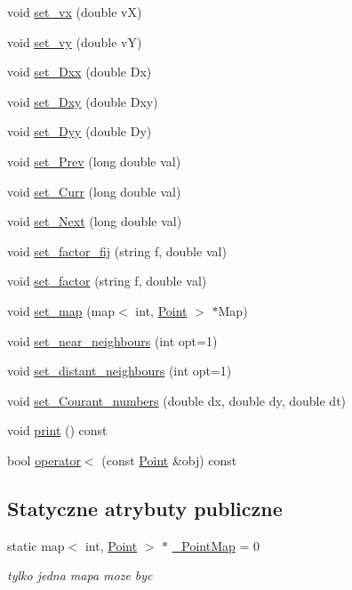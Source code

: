 \begin{DoxyCompactItemize}
\item 
void \hyperlink{class_point_ab68cfb3cd44fe4624dd89ec5b9275350}{set\+\_\+vx} (double v\+X)
\item 
void \hyperlink{class_point_aae045afff208fbd09dc3e466a0768781}{set\+\_\+vy} (double v\+Y)
\item 
void \hyperlink{class_point_a9c89304540fc3a2f9b7a6720f5bad95b}{set\+\_\+\+Dxx} (double Dx)
\item 
void \hyperlink{class_point_a0bf3e2831a50b62754eefb0cab6c3bbd}{set\+\_\+\+Dxy} (double Dxy)
\item 
void \hyperlink{class_point_adc5e03973821b3dee14d6b1c0a8e43ea}{set\+\_\+\+Dyy} (double Dy)
\item 
void \hyperlink{class_point_a1efdadc2ab2df0ba02ede0b23a3c2b40}{set\+\_\+\+Prev} (long double val)
\item 
void \hyperlink{class_point_a1f21dc53976e93ad52cfd2eafdb94209}{set\+\_\+\+Curr} (long double val)
\item 
void \hyperlink{class_point_a9be4fd3f7363583345023997921895ec}{set\+\_\+\+Next} (long double val)
\item 
void \hyperlink{class_point_ac25220ccb634802bdebc6de755afc807}{set\+\_\+factor\+\_\+fij} (string f, double val)
\item 
void \hyperlink{class_point_a9f37bcdde4f274fc2c9ee4e39fad9b22}{set\+\_\+factor} (string f, double val)
\item 
void \hyperlink{class_point_a743e76edf28eaf25c726051b66c2e256}{set\+\_\+map} (map$<$ int, \hyperlink{class_point}{Point} $>$ $\ast$Map)
\item 
void \hyperlink{class_point_a6c692685f4895204fb073a7a588dac29}{set\+\_\+near\+\_\+neighbours} (int opt=1)
\item 
void \hyperlink{class_point_aa3c1caf1c115df1bdf3ba45357f072ea}{set\+\_\+distant\+\_\+neighbours} (int opt=1)
\item 
void \hyperlink{class_point_abc3f1cb86556e34771306b46eac6a19a}{set\+\_\+\+Courant\+\_\+numbers} (double dx, double dy, double dt)
\item 
void \hyperlink{class_point_a20b27dff6a871012fa5e7c0d52fd6b98}{print} () const 
\item 
bool \hyperlink{class_point_a0d3c6e86bf5796952b0ac6d6092f7747}{operator$<$} (const \hyperlink{class_point}{Point} \&obj) const 
\end{DoxyCompactItemize}
\subsection*{Statyczne atrybuty publiczne}
\begin{DoxyCompactItemize}
\item 
static map$<$ int, \hyperlink{class_point}{Point} $>$ $\ast$ \hyperlink{class_point_a3384c3194e3d3c3196317013929e40d4}{\+\_\+\+Point\+Map} = 0
\begin{DoxyCompactList}\small\item\em tylko jedna mapa moze byc \end{DoxyCompactList}\end{DoxyCompactItemize}
